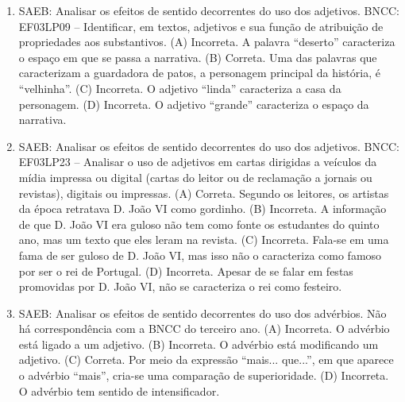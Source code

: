 \begin{enumerate}
\item
SAEB: Analisar os efeitos de sentido decorrentes do uso dos adjetivos.
BNCC: EF03LP09 -- Identificar, em textos, adjetivos e sua função de
atribuição de propriedades aos substantivos.
(A) Incorreta. A palavra ``deserto'' caracteriza o espaço em que se
passa a narrativa.
(B) Correta. Uma das palavras que caracterizam a
guardadora de patos, a personagem principal da história, é ``velhinha''.
(C) Incorreta. O adjetivo ``linda'' caracteriza a casa da personagem.
(D) Incorreta. O adjetivo ``grande'' caracteriza o espaço da narrativa.

\item
SAEB: Analisar os efeitos de sentido decorrentes do uso dos adjetivos.
BNCC: EF03LP23 -- Analisar o uso de adjetivos em cartas dirigidas a
veículos da mídia impressa ou digital (cartas do leitor ou de reclamação
a jornais ou revistas), digitais ou impressas.
(A) Correta. Segundo os leitores, os artistas da época retratava D. João VI como gordinho.
(B) Incorreta. A informação de que D. João VI era guloso não tem como fonte os estudantes do quinto ano, mas um texto que eles leram na revista.
(C) Incorreta. Fala-se em uma fama de ser guloso de D. João VI, mas isso não o caracteriza como famoso por ser o rei de Portugal.
(D) Incorreta. Apesar de se falar em festas promovidas por D. João VI, não se caracteriza o rei como festeiro.

\item
SAEB: Analisar os efeitos de sentido decorrentes do uso dos advérbios.
Não há correspondência com a BNCC do terceiro ano.
(A) Incorreta. O advérbio está ligado a um adjetivo.
(B) Incorreta. O advérbio está modificando um adjetivo.
(C) Correta. Por meio da expressão ``mais... que...'', em que aparece o advérbio ``mais'', cria-se uma comparação de superioridade.
(D) Incorreta. O advérbio tem sentido de intensificador.
\end{enumerate}


